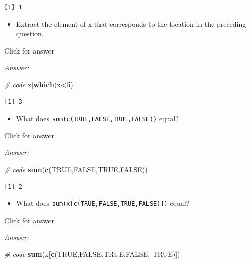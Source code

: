 \documentclass[
]{book}
\newenvironment{Shaded}{\begin{snugshade}}{\end{snugshade}}
\newcommand{\CommentTok}[1]{\textcolor[rgb]{0.56,0.35,0.01}{\textit{#1}}}
\newcommand{\ConstantTok}[1]{\textcolor[rgb]{0.56,0.35,0.01}{#1}}
\newcommand{\DecValTok}[1]{\textcolor[rgb]{0.00,0.00,0.81}{#1}}
\newcommand{\FunctionTok}[1]{\textcolor[rgb]{0.13,0.29,0.53}{\textbf{#1}}}
\newcommand{\NormalTok}[1]{#1}
\newcommand{\SpecialCharTok}[1]{\textcolor[rgb]{0.81,0.36,0.00}{\textbf{#1}}}
\providecommand{\tightlist}{%
  \setlength{\itemsep}{0pt}\setlength{\parskip}{0pt}}
\begin{document}
\begin{verbatim}
[1] 1
\end{verbatim}

\begin{itemize}
\tightlist
\item
  Extract the element of x that corresponds to the location in the preceding question.
\end{itemize}

Click for answer

\emph{Answer:}

\begin{Shaded}
\begin{Highlighting}[]
\CommentTok{\# code}
\NormalTok{x[}\FunctionTok{which}\NormalTok{(x}\SpecialCharTok{\textless{}}\DecValTok{5}\NormalTok{)]}
\end{Highlighting}
\end{Shaded}

\begin{verbatim}
[1] 3
\end{verbatim}

\begin{itemize}
\tightlist
\item
  What does \texttt{sum(c(TRUE,FALSE,TRUE,FALSE))} equal?
\end{itemize}

Click for answer

\emph{Answer:}

\begin{Shaded}
\begin{Highlighting}[]
\CommentTok{\# code}
\FunctionTok{sum}\NormalTok{(}\FunctionTok{c}\NormalTok{(}\ConstantTok{TRUE}\NormalTok{,}\ConstantTok{FALSE}\NormalTok{,}\ConstantTok{TRUE}\NormalTok{,}\ConstantTok{FALSE}\NormalTok{))}
\end{Highlighting}
\end{Shaded}

\begin{verbatim}
[1] 2
\end{verbatim}

\begin{itemize}
\tightlist
\item
  What does \texttt{sum(x{[}c(TRUE,FALSE,TRUE,FALSE){]})} equal?
\end{itemize}

Click for answer

\emph{Answer:}

\begin{Shaded}
\begin{Highlighting}[]
\CommentTok{\# code}
\FunctionTok{sum}\NormalTok{(x[}\FunctionTok{c}\NormalTok{(}\ConstantTok{TRUE}\NormalTok{,}\ConstantTok{FALSE}\NormalTok{,}\ConstantTok{TRUE}\NormalTok{,}\ConstantTok{FALSE}\NormalTok{, }\ConstantTok{TRUE}\NormalTok{)])}
\end{Highlighting}
\end{Shaded}
\end{document}

